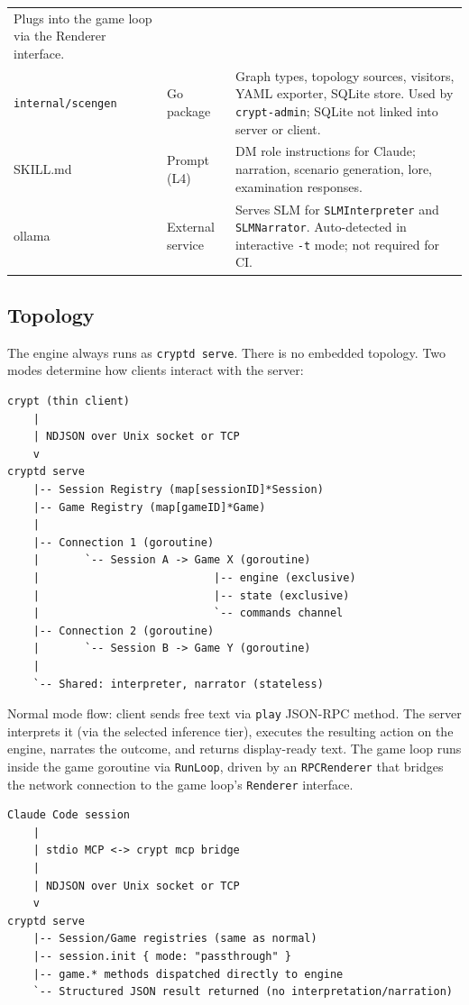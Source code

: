 \documentclass[a4paper,10pt]{article}
\newcommand{\iface}[1]{\texttt{#1}}
\newcommand{\cmd}[1]{\texttt{#1}}
\newcommand{\pkg}[1]{\texttt{#1}}
\begin{document}
\begin{center}
\begin{tabular}{lp{3cm}p{7cm}}
    Plugs into the game loop via the Renderer interface. \\
\pkg{internal/scengen}
  & Go package
  & Graph types, topology sources, visitors, YAML exporter, SQLite store.
    Used by \cmd{crypt-admin}; SQLite not linked into server or client. \\
SKILL.md
  & Prompt (L4)
  & DM role instructions for Claude; narration, scenario generation,
    lore, examination responses. \\
ollama
  & External service
  & Serves SLM for \texttt{SLMInterpreter} and \texttt{SLMNarrator}.
    Auto-detected in interactive \cmd{-t} mode; not required for CI. \\
\bottomrule
\end{tabular}
\end{center}

\subsection{Topology}

The engine always runs as \cmd{cryptd serve}.  There is no embedded
topology.  Two modes determine how clients interact with the server:

\begin{lstlisting}[title={Normal mode (crypt client -> cryptd serve)}]
crypt (thin client)
    |
    | NDJSON over Unix socket or TCP
    v
cryptd serve
    |-- Session Registry (map[sessionID]*Session)
    |-- Game Registry (map[gameID]*Game)
    |
    |-- Connection 1 (goroutine)
    |       `-- Session A -> Game X (goroutine)
    |                           |-- engine (exclusive)
    |                           |-- state (exclusive)
    |                           `-- commands channel
    |-- Connection 2 (goroutine)
    |       `-- Session B -> Game Y (goroutine)
    |
    `-- Shared: interpreter, narrator (stateless)
\end{lstlisting}

Normal mode flow: client sends free text via \texttt{play} JSON-RPC
method.  The server interprets it (via the selected inference tier),
executes the resulting action on the engine, narrates the outcome,
and returns display-ready text.  The game loop runs inside the game
goroutine via \texttt{RunLoop}, driven by an \texttt{RPCRenderer}
that bridges the network connection to the game loop's
\iface{Renderer} interface.

\begin{lstlisting}[title={Passthrough mode (crypt mcp -> cryptd serve)}]
Claude Code session
    |
    | stdio MCP <-> crypt mcp bridge
    |
    | NDJSON over Unix socket or TCP
    v
cryptd serve
    |-- Session/Game registries (same as normal)
    |-- session.init { mode: "passthrough" }
    |-- game.* methods dispatched directly to engine
    `-- Structured JSON result returned (no interpretation/narration)
\end{lstlisting}
\end{document}
